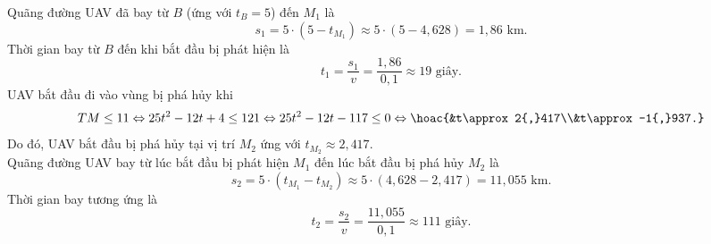 \begin{ex}
{\begin{itemchoice}
			Quãng đường UAV đã bay từ $B$ (ứng với $t_B = 5$) đến $M_1$ là
			\[s_1 = 5 \cdot (5 - t_{M_1}) \approx 5 \cdot (5 - 4{,}628) = 1{,}86\text{ km}.\]
			Thời gian bay từ $B$ đến khi bắt đầu bị phát hiện là
			\[t_1 = \dfrac{s_1}{v} = \dfrac{1{,}86}{0{,}1} \approx 19\text{ giây}.\]
			\itemch UAV bắt đầu đi vào vùng bị phá hủy khi \[TM \le 11 \Leftrightarrow 25t^2 - 12t + 4 \le 121 \Leftrightarrow 25t^2 - 12t - 117 \le 0\Leftrightarrow\hoac{&t\approx 2{,}417\\&t\approx -1{,}937.}\]
			Do đó, UAV bắt đầu bị phá hủy tại vị trí $M_2$ ứng với $t_{M_2} \approx 2{,}417$.\\
			Quãng đường UAV bay từ lúc bắt đầu bị phát hiện $M_1$ đến lúc bắt đầu bị phá hủy $M_2$ là
			\[s_2 = 5 \cdot (t_{M_1} - t_{M_2}) \approx 5 \cdot (4{,}628 - 2{,}417) = 11{,}055\text{ km}.\]
			Thời gian bay tương ứng là
			\[t_2 = \dfrac{s_2}{v} = \dfrac{11{,}055}{0{,}1} \approx 111\text{ giây}.\]
		\end{itemchoice}
	}
\end{ex}

